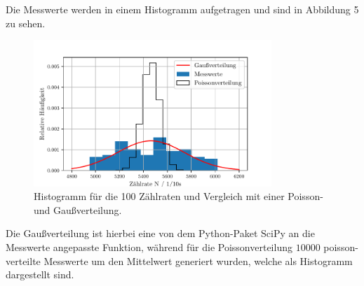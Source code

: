 Die Messwerte werden in einem Histogramm aufgetragen und sind in Abbildung 5 zu sehen.
\begin{figure}[H]
  \centering
  \includegraphics[width=0.8\textwidth]{stats.pdf}
  \caption{Histogramm für die 100 Zählraten und Vergleich mit einer Poisson- und Gaußverteilung. }
  \label{fig:plot}
\end{figure}

Die Gaußverteilung ist hierbei eine von dem Python-Paket SciPy an die Messwerte angepasste Funktion,
während für die Poissonverteilung $10000$ poisson-verteilte Messwerte um den Mittelwert generiert wurden,
welche als Histogramm dargestellt sind.